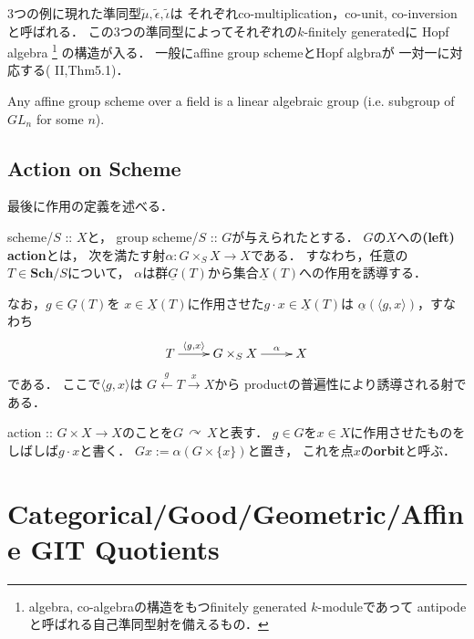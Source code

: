 \documentclass[a4paper]{jsarticle}
\newcommand{\Sch}{\mathbf{Sch}}
\newcommand{\func}[1]{\underline{#1}}
\newcommand{\acton}{\,\curvearrowright\,}
\begin{document}
    3つの例に現れた準同型$\tilde{\mu},\tilde{\epsilon},\tilde{\iota}$は
    それぞれco-multiplication，co-unit, co-inversionと呼ばれる．
    この3つの準同型によってそれぞれの$k$-finitely generatedに
    Hopf algebra
    \footnote
    {
        algebra, co-algebraの構造をもつfinitely generated $k$-moduleであって
        antipodeと呼ばれる自己準同型射を備えるもの．
    }
    の構造が入る．
    一般にaffine group schemeとHopf algbraが
    一対一に対応する(\cite{MilneAGS} II,Thm5.1)．

    \begin{Thm}
        Any affine group scheme over a field 
        is a linear algebraic group
        (i.e. subgroup of $GL_n$ for some $n$).
    \end{Thm}
    
    \subsection{Action on Scheme}
    最後に作用の定義を述べる．
    \begin{Def}
        scheme/$S$ :: $X$と，
        group scheme/$S$ :: $G$が与えられたとする．
        $G$の$X$への\textbf{(left) action}とは，
        次を満たす射$\alpha: G \times_S X \to X$である．
        すなわち，任意の$T \in \Sch/S$について，
        $\alpha$は群$\func{G}(T)$から集合$\func{X}(T)$への作用を誘導する．

        なお，$g \in \func{G}(T)$を
        $x \in \func{X}(T)$に作用させた$g \cdot x \in \func{X}(T)$は
        $\func{\alpha}(\langle g,x \rangle)$，すなわち
        \[
        \xymatrix
        {
            T \ar[r]^-{\langle g,x \rangle}& G \times_S X \ar[r]^-{\alpha}& X
        }
        \]
        である．
        ここで$\langle g, x \rangle$は
        $G \xleftarrow{g} T \xrightarrow{x} X$から
        productの普遍性により誘導される射である．

        action :: $G \times X \to X$のことを$G \acton X$と表す．
        $g \in G$を$x \in X$に作用させたものをしばしば$g \cdot x$と書く．
        $Gx:=\alpha(G \times \{x\})$と置き，
        これを点$x$の\textbf{orbit}と呼ぶ．
    \end{Def}

\section{Categorical/Good/Geometric/Affine GIT Quotients}
\end{document}
